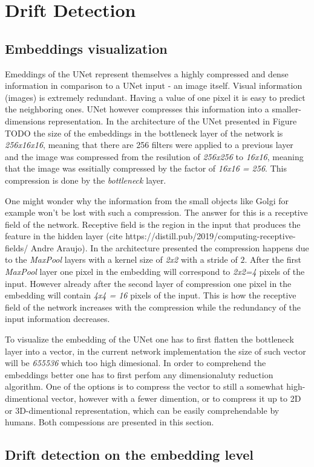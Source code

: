\section{Drift Detection}
\subsection{Embeddings visualization}
Emeddings of the UNet represent themselves a highly compressed and dense information in comparison to a UNet input - an image itself. Visual information (images) is extremely redundant. Having a value of one pixel it is easy to predict the neighboring ones. UNet however compresses this information into a smaller-dimensions representation. In the architecture of the UNet presented in Figure TODO the size of the embeddings in the bottleneck layer of the network is \textit{256x16x16}, meaning that there are 256 filters were applied to a previous layer and the image was compressed from the resilution of \textit{256x256} to \textit{16x16}, meaning that the image was essitially compressed by the factor of \textit{16x16 = 256}. This compression is done by the \textit{bottleneck} layer.

One might wonder why the information from the small objects like Golgi for example won't be lost with such a compression. The answer for this is a receptive field of the network. Receptive field is the region in the input that produces the feature in the hidden layer (cite https://distill.pub/2019/computing-receptive-fields/ Andre Araujo). In the architecture presented the compression happens due to the \textit{MaxPool} layers with a kernel size of \textit{2x2} with a stride of $2$. After the first \textit{MaxPool} layer one pixel in the embedding will correspond to \textit{2x2=4} pixels of the input. However already after the second layer of compression one pixel in the embedding will contain \textit{4x4 = 16} pixels of the input. This is how the receptive field of the network increases with the compression while the redundancy of the input information decreases.

To visualize the embedding of the UNet one has to first flatten the bottleneck layer into a vector, in the current network implementation the size of such vector will be \textit{655536} which too high dimesional. In order to comprehend the embeddings better one has to first perfom any dimensionaluty reduction algorithm. One of the options is to compress the vector to still a somewhat high-dimentional vector, however with a fewer dimention, or to compress it up to 2D or 3D-dimentional representation, which can be easily comprehendable by humans. Both compessions are presented in this section.

\subsection{Drift detection on the embedding level}